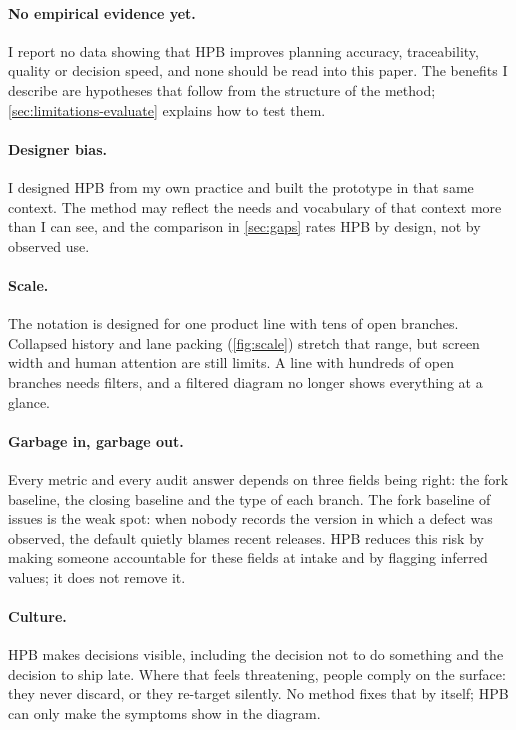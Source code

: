 \paragraph{No empirical evidence yet.}
I report no data showing that HPB improves planning accuracy, traceability,
quality or decision speed, and none should be read into this paper. The
benefits I describe are hypotheses that follow from the structure of the
method; \cref{sec:limitations-evaluate} explains how to test them.

\paragraph{Designer bias.}
I designed HPB from my own practice and built the prototype in that same
context. The method may reflect the needs and vocabulary of that context
more than I can see, and the comparison in \cref{sec:gaps} rates HPB by
design, not by observed use.

\paragraph{Scale.}
The notation is designed for one product line with tens of open branches.
Collapsed history and lane packing (\cref{fig:scale}) stretch that range,
but screen width and human attention are still limits. A line with
hundreds of open branches needs filters, and a filtered diagram no longer
shows everything at a glance.

\paragraph{Garbage in, garbage out.}
Every metric and every audit answer depends on three fields being right:
the fork baseline, the closing baseline and the type of each branch. The
fork baseline of issues is the weak spot: when nobody records the version
in which a defect was observed, the default quietly blames recent
releases. HPB reduces this risk by making someone accountable for these
fields at intake and by flagging inferred values; it does not remove it.

\paragraph{Culture.}
HPB makes decisions visible, including the decision not to do something
and the decision to ship late. Where that feels threatening, people comply
on the surface: they never discard, or they re-target silently. No method
fixes that by itself; HPB can only make the symptoms show in the diagram.

